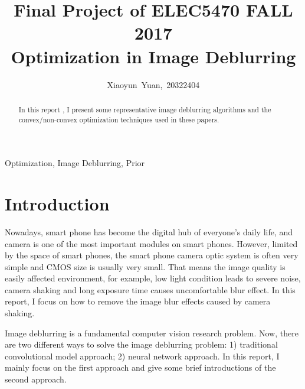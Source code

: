 \documentclass[journal, onecolumn, 10pt]{IEEEtran}
\begin{document}
\title{Final Project of ELEC5470 FALL 2017 \\ Optimization in Image Deblurring }

\author{Xiaoyun~Yuan,~20322404}


%
{}
\maketitle

\begin{abstract}
In this report , I present some representative image deblurring algorithms and the convex/non-convex optimization techniques used in these papers. 
\end{abstract}

\begin{IEEEkeywords}
Optimization, Image Deblurring, Prior 
\end{IEEEkeywords}

\IEEEpeerreviewmaketitle

\section{Introduction}
\label{sec:introduction}
Nowadays, smart phone has become the digital hub of everyone's daily life, and camera is one of the most important modules on smart phones. However, limited by the space of smart phones, the smart phone camera optic system is often very simple and CMOS size is usually very small. That means the image quality is easily affected environment, for example, low light condition leads to severe noise, camera shaking and long exposure time causes uncomfortable blur effect. In this report, I focus on how to remove the image blur effects caused by camera shaking.

Image deblurring is a fundamental computer vision research problem. Now, there are two different ways to solve the image deblurring problem: 1) traditional convolutional model approach; 2) neural network approach. In this report, I mainly focus on the first approach and give some brief introductions of the second approach.
\end{document}
